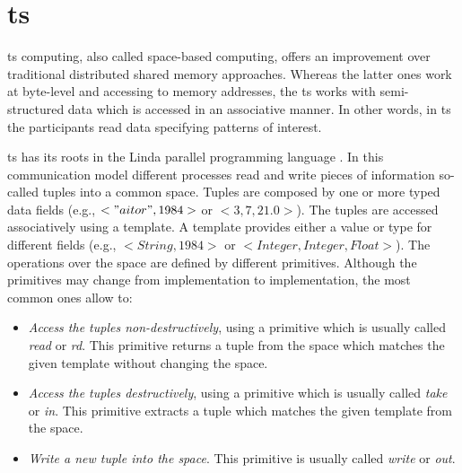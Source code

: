 \section{\acl{ts}}
\label{sec:tuplespaces_eoa}


\acf{ts} computing, also called space-based computing, offers an improvement over traditional distributed shared memory approaches.
Whereas the latter ones work at byte-level and accessing to memory addresses,
the \acl{ts} works with semi-structured data which is accessed in an associative manner.
In other words, in \ac{ts} the participants read data specifying patterns of interest.


\ac{ts} has its roots in the Linda parallel programming language \citep{gelernter_generative_1985}.
In this communication model different processes read and write pieces of information so-called tuples into a common space.
Tuples are composed by one or more typed data fields (e.g., $<"aitor",1984>$ or $<3,7,21.0>$).
The tuples are accessed associatively using a template.
A template provides either a value or type for different fields (e.g., $<String,1984>$ or $<Integer, Integer, Float>$).
The operations over the space are defined by different primitives.
Although the primitives may change from implementation to implementation, the most common ones allow to:

\begin{itemize}
  \item \emph{Access the tuples non-destructively}, using a primitive which is usually called \emph{read} or \emph{rd}.
	This primitive returns a tuple from the space which matches the given template without changing the space.
  \item \emph{Access the tuples destructively}, using a primitive which is usually called \emph{take} or \emph{in}.
	This primitive extracts a tuple which matches the given template from the space.
  \item \emph{Write a new tuple into the space}. This primitive is usually called \emph{write} or \emph{out}.
\end{itemize}